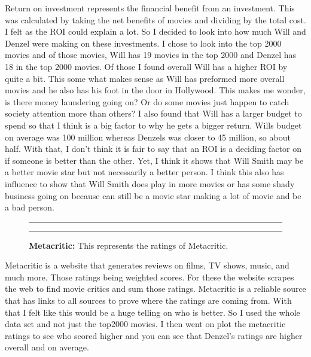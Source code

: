 \documentclass[]{article}
\begin{document}
Return on investment represents the financial benefit from an
investment. This was calculated by taking the net benefits of movies and
dividing by the total cost. I felt as the ROI could explain a lot. So I
decided to look into how much Will and Denzel were making on these
investments. I chose to look into the top 2000 movies and of those
movies, Will has 19 movies in the top 2000 and Denzel has 18 in the top
2000 movies. Of those I found overall Will has a higher ROI by quite a
bit. This some what makes sense as Will has preformed more overall
movies and he also has his foot in the door in Hollywood. This makes me
wonder, is there money laundering going on? Or do some movies just
happen to catch society attention more than others? I also found that
Will has a larger budget to spend so that I think is a big factor to why
he gets a bigger return. Wills budget on average was 100 million whereas
Denzels was closer to 45 million, so about half. With that, I don't
think it is fair to say that an ROI is a deciding factor on if someone
is better than the other. Yet, I think it shows that Will Smith may be a
better movie star but not necessarily a better person. I think this also
has influence to show that Will Smith does play in more movies or has
some shady business going on because can still be a movie star making a
lot of movie and be a bad person.

\begin{figure}[!ht]
    \hrule
    \begin{center}
    \end{center}
    \label{fig:oneimage-1}
    \caption{ \textbf{Metacritic:} This represents the ratings of Metacritic.}
    \hrule
\end{figure}

Metacritic is a website that generates reviews on films, TV shows,
music, and much more. Those ratings being weighted scores. For these the
website scrapes the web to find movie critics and sum those ratings.
Metacritic is a reliable source that has links to all sources to prove
where the ratings are coming from. With that I felt like this would be a
huge telling on who is better. So I used the whole data set and not just
the top2000 movies. I then went on plot the metacritic ratings to see
who scored higher and you can see that Denzel's ratings are higher
overall and on average.
\end{document}
